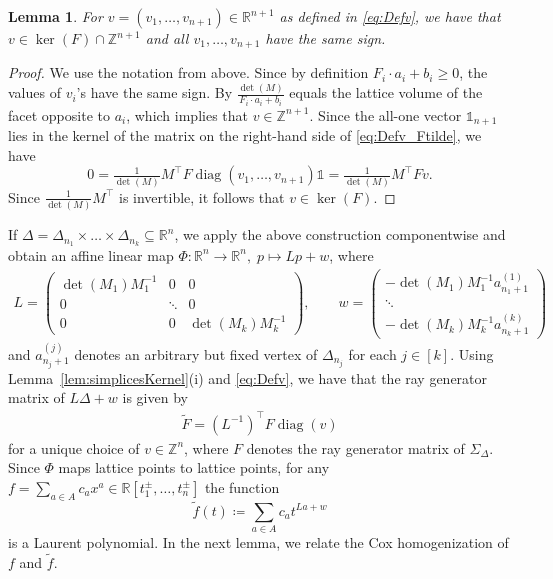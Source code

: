 \documentclass[a4paper,11pt]{amsart}
\newtheorem{lemma}[theorem]{Lemma}
\theoremstyle{definition}
\DeclareMathOperator{\diag}{diag}
\newcommand{\ZZ}{\mathbb{Z}}
\newcommand{\RR}{\mathbb{R}}
\begin{document}
\begin{lemma}
\label{lemma:v_inKernel}
    For $v = (v_1,\dots,v_{n+1}) \in \RR^{n+1}$ as defined in \eqref{eq:Defv}, we have that $v \in \ker (F) \cap {\ZZ^{n+1}}$ and all $v_1,\dots,v_{n+1}$ have the same sign.
\end{lemma}

\begin{proof}
We use the notation from above.
Since by definition $F_i \cdot a_i + b_i \geq 0$, the values of $v_i$'s have the same sign.
By \cite[Proposition 1]{Bruns} $\tfrac{\det(M)}{F_i \cdot a_i + b_i}$ equals the lattice volume of the facet opposite to $a_i$, which implies that $v \in \ZZ^{n+1}$. 
Since the all-one vector $\mathds{1}_{n+1}$ lies in the kernel of the matrix on the right-hand side of \eqref{eq:Defv_Ftilde}, we have 
    \[ 0 =  \tfrac{1}{\det(M)} M^\top F \diag(v_1,\dots,v_{n+1}) \mathds{1} =  \tfrac{1}{\det(M)} M^\top F  v. \]
Since $\tfrac{1}{\det(M)} M^\top$ is invertible, it follows that $v \in \ker(F)$.
\end{proof}


If $\Delta = \Delta_{n_1} \times \dots \times \Delta_{n_k} \subseteq \RR^n$, we apply the above construction componentwise and obtain an affine linear map $\Phi\colon \RR^n \to \RR^n, \;  p \mapsto L p  + w$, where 
\begin{align}
\label{eq:Landw}
        L = \begin{pmatrix}
\det(M_1) M_1^{-1} & 0 & 0 \\
0 & \ddots & 0 \\
0 & 0 & \det(M_k) M_k^{-1}  
\end{pmatrix}, \qquad w = \begin{pmatrix}
-\det(M_1) M_1^{-1} a_{n_1+1}^{(1)}  \\
 \ddots \\
 -\det(M_k) M_k^{-1} a_{n_k+1}^{(k)}  
\end{pmatrix}
\end{align}
and $a^{(j)}_{n_j+1}$ denotes an arbitrary but fixed vertex of $\Delta_{n_j}$ for each $j \in [k]$.
Using Lemma~\ref{lem:simplicesKernel}(i) and \eqref{eq:Defv}, we have that the ray generator matrix of $L \Delta + w$ is given by 
\begin{align}
    \label{eq:ChoiceOfv}
    \widetilde{F} = (L^{-1})^\top F \diag(v)
\end{align}
for a unique choice of $v \in \ZZ^n$, where $F$ denotes the ray generator matrix of $\Sigma_\Delta$. Since $\Phi$ maps lattice points to lattice points, for any $f = \sum_{a\in A}c_a x^a \in \RR[t_1^\pm,\dots,t_n^\pm]$ the function 
\[\widetilde{f}(t) \coloneqq   \sum_{a\in A} c_a t^{La + w}\]
is a Laurent polynomial. In the next lemma, we relate the Cox homogenization of $f$ and $\widetilde{f}$.
\end{document}
